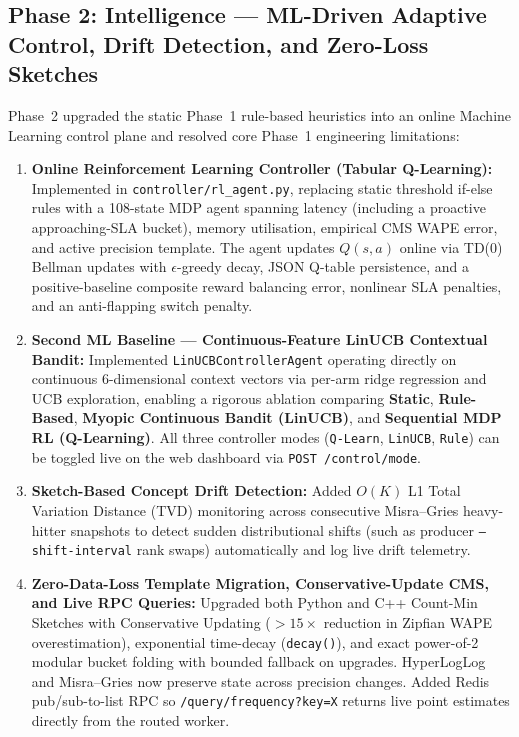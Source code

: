 \subsection{Phase 2: Intelligence — ML-Driven Adaptive Control, Drift Detection, and Zero-Loss Sketches}

Phase~2 upgraded the static Phase~1 rule-based heuristics into an online Machine Learning control plane and resolved core Phase~1 engineering limitations:

\begin{enumerate}
 \item \textbf{Online Reinforcement Learning Controller (Tabular Q-Learning):}
 Implemented in \texttt{controller/rl\_agent.py}, replacing static threshold if-else rules with a 108-state MDP agent spanning latency (including a proactive approaching-SLA bucket), memory utilisation, empirical CMS WAPE error, and active precision template. The agent updates $Q(s,a)$ online via TD(0) Bellman updates with $\epsilon$-greedy decay, JSON Q-table persistence, and a positive-baseline composite reward balancing error, nonlinear SLA penalties, and an anti-flapping switch penalty.

 \item \textbf{Second ML Baseline — Continuous-Feature LinUCB Contextual Bandit:}
 Implemented \texttt{LinUCBControllerAgent} operating directly on continuous 6-dimensional context vectors via per-arm ridge regression and UCB exploration, enabling a rigorous ablation comparing \textbf{Static}, \textbf{Rule-Based}, \textbf{Myopic Continuous Bandit (LinUCB)}, and \textbf{Sequential MDP RL (Q-Learning)}. All three controller modes (\texttt{Q-Learn}, \texttt{LinUCB}, \texttt{Rule}) can be toggled live on the web dashboard via \texttt{POST /control/mode}.

 \item \textbf{Sketch-Based Concept Drift Detection:}
 Added $O(K)$ L1 Total Variation Distance (TVD) monitoring across consecutive Misra--Gries heavy-hitter snapshots to detect sudden distributional shifts (such as producer \texttt{--shift-interval} rank swaps) automatically and log live drift telemetry.

 \item \textbf{Zero-Data-Loss Template Migration, Conservative-Update CMS, and Live RPC Queries:}
 Upgraded both Python and C++ Count-Min Sketches with Conservative Updating ($>15\times$ reduction in Zipfian WAPE overestimation), exponential time-decay (\texttt{decay()}), and exact power-of-2 modular bucket folding with bounded fallback on upgrades. HyperLogLog and Misra--Gries now preserve state across precision changes. Added Redis pub/sub-to-list RPC so \texttt{/query/frequency?key=X} returns live point estimates directly from the routed worker.


\end{enumerate}
